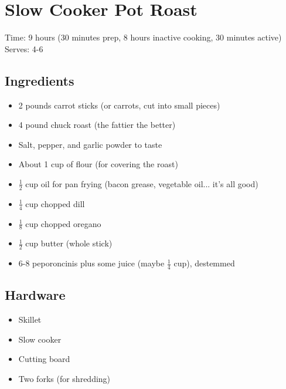 \section{Slow Cooker Pot Roast}
\label{slowCookerPotRoast}
\setcounter{secnumdepth}{0}
Time: 9 hours (30 minutes prep, 8 hours inactive cooking, 30 minutes active)
Serves: 4-6

\begin{multicols}{2}
\subsection*{Ingredients}
\begin{itemize}
    \item 2 pounds carrot sticks (or carrots, cut into small pieces)
    \item 4 pound chuck roast (the fattier the better)
    \item Salt, pepper, and garlic powder to taste
    \item About 1 cup of flour (for covering the roast)
    \item \( \frac{1}{2} \) cup oil for pan frying (bacon grease, vegetable oil... it's all good)
    \item \( \frac{1}{4} \) cup chopped dill
    \item \( \frac{1}{8} \) cup chopped oregano
    \item \( \frac{1}{2} \) cup butter (whole stick)
    \item 6-8 peporoncinis plus some juice (maybe \( \frac{1}{4} \) cup), destemmed
\end{itemize}

\subsection*{Hardware}
\begin{itemize}
    \item Skillet
    \item Slow cooker
    \item Cutting board
    \item Two forks (for shredding)
\end{itemize}
\clearpage


\end{multicols}
